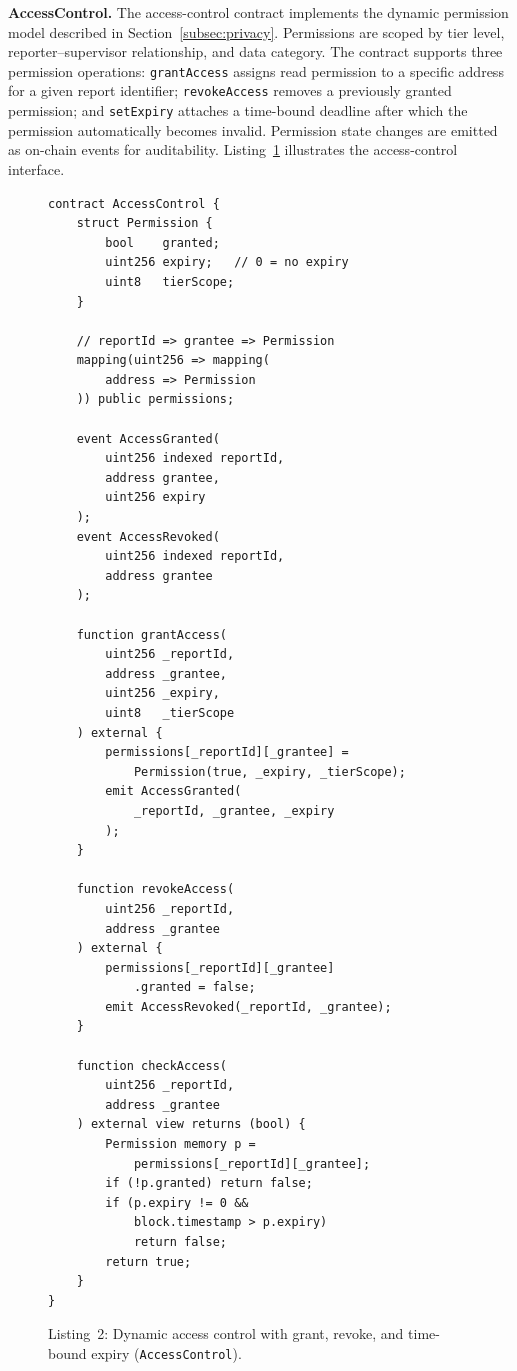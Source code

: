 \textbf{AccessControl.} The access-control contract implements the dynamic permission model described in Section~\ref{subsec:privacy}. Permissions are scoped by tier level, reporter--supervisor relationship, and data category. The contract supports three permission operations: \texttt{grantAccess} assigns read permission to a specific address for a given report identifier; \texttt{revokeAccess} removes a previously granted permission; and \texttt{setExpiry} attaches a time-bound deadline after which the permission automatically becomes invalid. Permission state changes are emitted as on-chain events for auditability. Listing~\ref{lst:acl} illustrates the access-control interface.

\begin{figure}[!ht]
\begin{verbatim}
contract AccessControl {
    struct Permission {
        bool    granted;
        uint256 expiry;   // 0 = no expiry
        uint8   tierScope;
    }

    // reportId => grantee => Permission
    mapping(uint256 => mapping(
        address => Permission
    )) public permissions;

    event AccessGranted(
        uint256 indexed reportId,
        address grantee,
        uint256 expiry
    );
    event AccessRevoked(
        uint256 indexed reportId,
        address grantee
    );

    function grantAccess(
        uint256 _reportId,
        address _grantee,
        uint256 _expiry,
        uint8   _tierScope
    ) external {
        permissions[_reportId][_grantee] =
            Permission(true, _expiry, _tierScope);
        emit AccessGranted(
            _reportId, _grantee, _expiry
        );
    }

    function revokeAccess(
        uint256 _reportId,
        address _grantee
    ) external {
        permissions[_reportId][_grantee]
            .granted = false;
        emit AccessRevoked(_reportId, _grantee);
    }

    function checkAccess(
        uint256 _reportId,
        address _grantee
    ) external view returns (bool) {
        Permission memory p =
            permissions[_reportId][_grantee];
        if (!p.granted) return false;
        if (p.expiry != 0 &&
            block.timestamp > p.expiry)
            return false;
        return true;
    }
}
\end{verbatim}
\caption*{Listing~2: Dynamic access control with grant, revoke, and time-bound expiry (\texttt{AccessControl}).}\label{lst:acl}
\end{figure}

